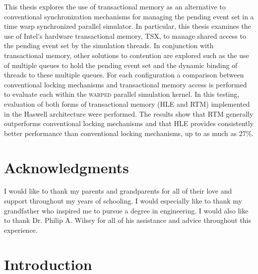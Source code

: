 \documentclass[11pt]{book}
\newcommand\blankpage{%
    \null
    \thispagestyle{empty}%
    \addtocounter{page}{-1}%
    \newpage}
\begin{document}
This thesis explores the use of transactional memory as an alternative to
conventional synchronization mechanisms for managing the pending event set in a
time warp synchronized parallel simulator.  In particular, this thesis examines
the use of Intel's hardware transactional memory, TSX, to manage shared access
to the pending event set by the simulation threads.  In conjunction with
transactional memory, other solutions to contention are explored such as the use
of multiple queues to hold the pending event set and the dynamic binding of
threads to these multiple queues.  For each configuration a comparison between
conventional locking mechanisms and transactional memory access is performed to
evaluate each within the \textsc{warped} parallel simulation kernel.  In this
testing, evaluation of both forms of transactional memory (HLE and RTM)
implemented in the Haswell architecture were performed.  The results show that
RTM generally outperforms  conventional locking mechanisms and that HLE provides
consistently better performance than conventional locking mechanisms, up to as
much as 27\%.

\afterpage{\blankpage}


\chapter*{Acknowledgments} 

I would like to thank my parents and grandparents for all of their love and
support throughout my years of schooling.  I would especially like to thank my
grandfather who inspired me to pursue a degree in engineering.  I would also
like to thank Dr. Philip A. Wilsey for all of his assistance and advice
throughout this experience.

\tableofcontents \markright{ }
\listoffigures \markright{ }
\listoftables \markright{ }

\clearpage
{} \setcounter{page}{1}

\chapter{Introduction}\label{intro} 
\end{document}
